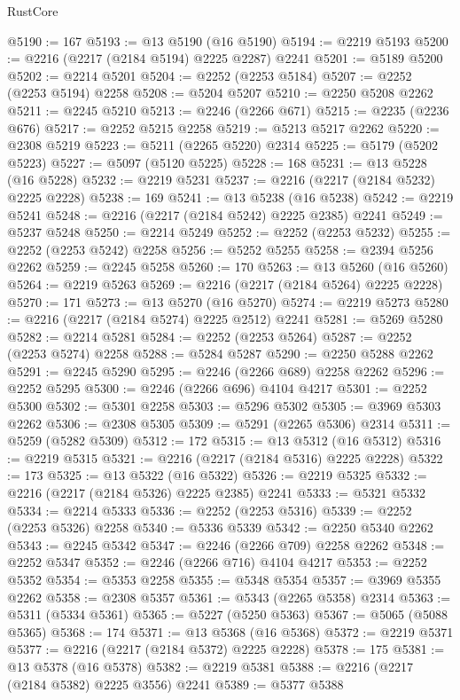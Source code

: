 \begin{lexlean}{RustCore}
\begin{coremodule}
@5190 := 167
@5193 := @13 @5190 (@16 @5190)
@5194 := @2219 @5193
@5200 := @2216 (@2217 (@2184 @5194) @2225 @2287) @2241
@5201 := @5189 @5200
@5202 := @2214 @5201
@5204 := @2252 (@2253 @5184)
@5207 := @2252 (@2253 @5194) @2258
@5208 := @5204 @5207
@5210 := @2250 @5208 @2262
@5211 := @2245 @5210
@5213 := @2246 (@2266 @671)
@5215 := @2235 (@2236 @676)
@5217 := @2252 @5215 @2258
@5219 := @5213 @5217 @2262
@5220 := @2308 @5219
@5223 := @5211 (@2265 @5220) @2314
@5225 := @5179 (@5202 @5223)
@5227 := @5097 (@5120 @5225)
@5228 := 168
@5231 := @13 @5228 (@16 @5228)
@5232 := @2219 @5231
@5237 := @2216 (@2217 (@2184 @5232) @2225 @2228)
@5238 := 169
@5241 := @13 @5238 (@16 @5238)
@5242 := @2219 @5241
@5248 := @2216 (@2217 (@2184 @5242) @2225 @2385) @2241
@5249 := @5237 @5248
@5250 := @2214 @5249
@5252 := @2252 (@2253 @5232)
@5255 := @2252 (@2253 @5242) @2258
@5256 := @5252 @5255
@5258 := @2394 @5256 @2262
@5259 := @2245 @5258
@5260 := 170
@5263 := @13 @5260 (@16 @5260)
@5264 := @2219 @5263
@5269 := @2216 (@2217 (@2184 @5264) @2225 @2228)
@5270 := 171
@5273 := @13 @5270 (@16 @5270)
@5274 := @2219 @5273
@5280 := @2216 (@2217 (@2184 @5274) @2225 @2512) @2241
@5281 := @5269 @5280
@5282 := @2214 @5281
@5284 := @2252 (@2253 @5264)
@5287 := @2252 (@2253 @5274) @2258
@5288 := @5284 @5287
@5290 := @2250 @5288 @2262
@5291 := @2245 @5290
@5295 := @2246 (@2266 @689) @2258 @2262
@5296 := @2252 @5295
@5300 := @2246 (@2266 @696) @4104 @4217
@5301 := @2252 @5300
@5302 := @5301 @2258
@5303 := @5296 @5302
@5305 := @3969 @5303 @2262
@5306 := @2308 @5305
@5309 := @5291 (@2265 @5306) @2314
@5311 := @5259 (@5282 @5309)
@5312 := 172
@5315 := @13 @5312 (@16 @5312)
@5316 := @2219 @5315
@5321 := @2216 (@2217 (@2184 @5316) @2225 @2228)
@5322 := 173
@5325 := @13 @5322 (@16 @5322)
@5326 := @2219 @5325
@5332 := @2216 (@2217 (@2184 @5326) @2225 @2385) @2241
@5333 := @5321 @5332
@5334 := @2214 @5333
@5336 := @2252 (@2253 @5316)
@5339 := @2252 (@2253 @5326) @2258
@5340 := @5336 @5339
@5342 := @2250 @5340 @2262
@5343 := @2245 @5342
@5347 := @2246 (@2266 @709) @2258 @2262
@5348 := @2252 @5347
@5352 := @2246 (@2266 @716) @4104 @4217
@5353 := @2252 @5352
@5354 := @5353 @2258
@5355 := @5348 @5354
@5357 := @3969 @5355 @2262
@5358 := @2308 @5357
@5361 := @5343 (@2265 @5358) @2314
@5363 := @5311 (@5334 @5361)
@5365 := @5227 (@5250 @5363)
@5367 := @5065 (@5088 @5365)
@5368 := 174
@5371 := @13 @5368 (@16 @5368)
@5372 := @2219 @5371
@5377 := @2216 (@2217 (@2184 @5372) @2225 @2228)
@5378 := 175
@5381 := @13 @5378 (@16 @5378)
@5382 := @2219 @5381
@5388 := @2216 (@2217 (@2184 @5382) @2225 @3556) @2241
@5389 := @5377 @5388

\end{coremodule}
\end{lexlean}
